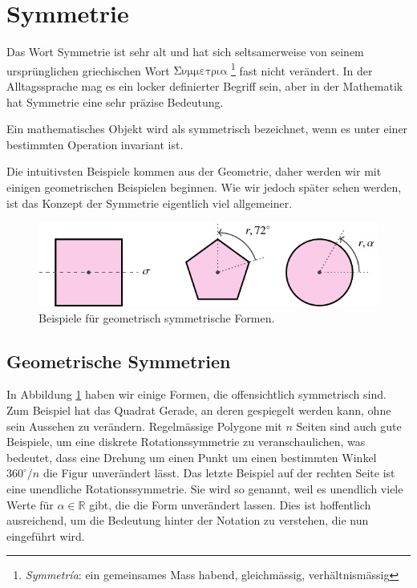 \section{Symmetrie}
Das Wort Symmetrie ist sehr alt und hat sich seltsamerweise von seinem
ursprünglichen griechischen Wort
\(\mathrm{\Sigma\nu\mu\mu\varepsilon\tau\rho\iota\alpha}\)
\footnote{\emph{Symmetr\'ia}: ein gemeinsames Mass habend, gleichmässig,
verhältnismässig} fast nicht verändert. In der Alltagssprache mag es ein
locker definierter Begriff sein, aber in der Mathematik hat Symmetrie eine sehr
präzise Bedeutung.
\begin{definition}[Symmetrie]
	Ein mathematisches Objekt wird als symmetrisch bezeichnet, wenn es unter einer
	bestimmten Operation invariant ist.
\end{definition}
Die intuitivsten Beispiele kommen aus der Geometrie, daher werden wir mit
einigen geometrischen Beispielen beginnen. Wie wir jedoch später sehen werden,
ist das Konzept der Symmetrie eigentlich viel allgemeiner.  

\begin{figure}
	\centering
	\includegraphics{papers/punktgruppen/figures/symmetric-shapes}
	\caption{
		Beispiele für geometrisch symmetrische Formen.
		\label{fig:punktgruppen:geometry-example}
	}
\end{figure}

\subsection{Geometrische Symmetrien}

In Abbildung \ref{fig:punktgruppen:geometry-example} haben wir einige Formen,
die offensichtlich symmetrisch sind.  Zum Beispiel hat das Quadrat Gerade, an
deren gespiegelt werden kann, ohne sein Aussehen zu verändern.  Regelmässige
Polygone mit \(n\) Seiten sind auch gute Beispiele, um eine diskrete
Rotationssymmetrie zu veranschaulichen, was bedeutet, dass eine Drehung um
einen Punkt um einen bestimmten Winkel \(360^\circ/n\) die Figur unverändert
lässt.  Das letzte Beispiel auf der rechten Seite ist eine unendliche
Rotationssymmetrie. Sie wird so genannt, weil es unendlich viele Werte für
\(\alpha \in \mathbb{R}\) gibt, die die Form unverändert lassen.  Dies ist
hoffentlich ausreichend, um die Bedeutung hinter der Notation zu verstehen, die
nun eingeführt wird.

